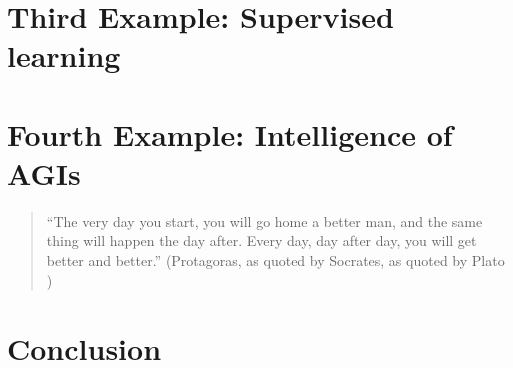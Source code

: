 \documentclass[reqno]{article}
\theoremstyle{definition}
\begin{document}
\section{Third Example: Supervised learning}

\section{Fourth Example: Intelligence of AGIs}

\begin{quote}
    ``The very day you start, you will go home a better man,
    and the same thing will happen the day after. Every day,
    day after day, you will get better and better.''
    (Protagoras, as quoted by Socrates, as quoted by Plato \cite{protagoras})
\end{quote}

\section{Conclusion}



\end{document}
